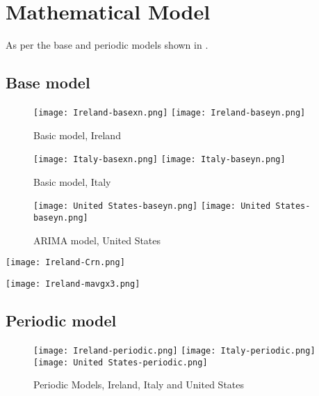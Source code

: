 \section{Mathematical Model}
\label{ch:mathmodel}

As per the base and periodic models shown in \cite{grigor20}.

\subsection{Base model}

\begin{figure}[H]
  \texttt{[image: Ireland-basexn.png]} \label{fig:ireland-basexn}
\endminipage\hfill
{}
  \texttt{[image: Ireland-baseyn.png]} \label{fig:ireland-baseyn}
\endminipage
\caption{Basic model, Ireland}
\end{figure}

\begin{figure}[H]
  \texttt{[image: Italy-basexn.png]} \label{fig:italy-basexn}
\endminipage\hfill
{}
  \texttt{[image: Italy-baseyn.png]} \label{fig:italy-baseyn}
\endminipage
\caption{Basic model, Italy}
\end{figure}

\begin{figure}[H]
  \texttt{[image: United States-baseyn.png]} \label{fig:usa-basexn}
\endminipage\hfill
{}
  \texttt{[image: United States-baseyn.png]} \label{fig:usa-baseyn}
\endminipage
\caption{ARIMA model, United States}
\end{figure}

\texttt{[image: Ireland-Crn.png]}

\texttt{[image: Ireland-mavgx3.png]}


\subsection{Periodic model}

\begin{figure}[H]
  \texttt{[image: Ireland-periodic.png]} \label{fig:usa-periodic}
\endminipage
{}
  \texttt{[image: Italy-periodic.png]} \label{fig:italy-periodic}
\endminipage
{}
  \texttt{[image: United States-periodic.png]} \label{fig:usa-periodic}
\endminipage
\caption{Periodic Models, Ireland, Italy and United States}
\end{figure}

